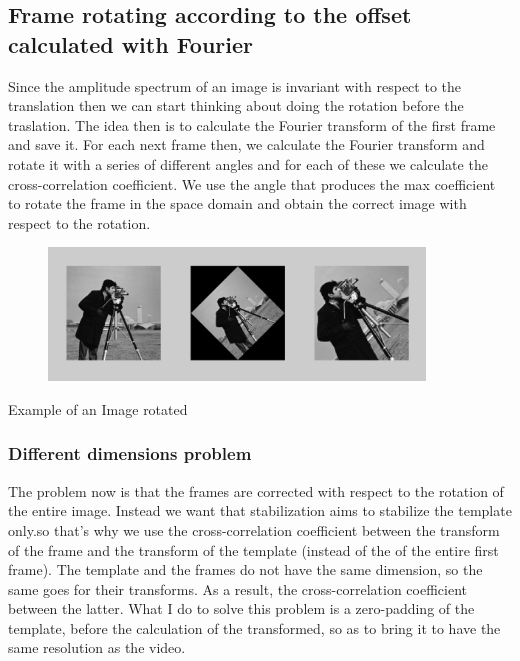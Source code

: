 \documentclass[a4paper]{article}
\begin{document}
	\subsection{Frame rotating according to the offset calculated with Fourier}
	Since the amplitude spectrum of an image is invariant with respect to the translation then we can start thinking about doing the rotation before the traslation. The idea then is to calculate the Fourier transform of the first frame and save it. For each next frame then, we calculate the Fourier transform and rotate it with a series of different angles and for each of these we calculate the cross-correlation coefficient. We use the angle that produces the  max coefficient to rotate the frame in the space domain and obtain the correct image with respect to the rotation.
	
	\begin{figure}[htpb!] 
		\centering 
		\includegraphics[width=100mm]{ImageRotation.png}
	\end{figure}
	Example of an Image rotated

	\subsubsection{Different dimensions problem}
	The problem now is that the frames are corrected with respect to the rotation of the entire image. Instead we want that stabilization aims to stabilize the template only.so that's why we use the cross-correlation coefficient between the transform of the frame and the transform of the template (instead of the of the entire first frame).
	The template and the frames do not have the same dimension, so the same goes for their transforms. As a result, the cross-correlation coefficient between the latter.	What I do to solve this problem is a zero-padding of the template, before the calculation of the	transformed, so as to bring it to have the same resolution as the video.
\end{document}
